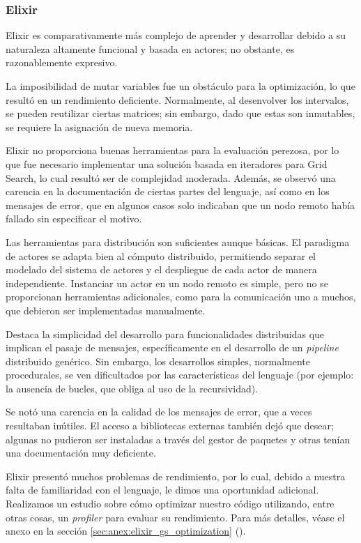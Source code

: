 \documentclass[11pt]{article}
\let\Oldsubsubsection\subsubsection
\renewcommand{\subsubsection}{\FloatBarrier\Oldsubsubsection}
\begin{document}
\subsubsection{Elixir}

Elixir es comparativamente más complejo de aprender y desarrollar debido a su naturaleza altamente funcional y basada en actores; no obstante, es razonablemente expresivo.

La imposibilidad de mutar variables fue un obstáculo para la optimización, lo que resultó en un rendimiento deficiente. Normalmente, al desenvolver los intervalos, se pueden reutilizar ciertas matrices; sin embargo, dado que estas son inmutables, se requiere la asignación de nueva memoria.

Elixir no proporciona buenas herramientas para la evaluación perezosa, por lo que fue necesario implementar una solución basada en iteradores para Grid Search, lo cual resultó ser de complejidad moderada. Además, se observó una carencia en la documentación de ciertas partes del lenguaje, así como en los mensajes de error, que en algunos casos solo indicaban que un nodo remoto había fallado sin especificar el motivo.

Las herramientas para distribución son suficientes aunque básicas. El paradigma de actores se adapta bien al cómputo distribuido, permitiendo separar el modelado del sistema de actores y el despliegue de cada actor de manera independiente. Instanciar un actor en un nodo remoto es simple, pero no se proporcionan herramientas adicionales, como para la comunicación uno a muchos, que debieron ser implementadas manualmente.

Destaca la simplicidad del desarrollo para funcionalidades distribuidas que implican el pasaje de mensajes, específicamente en el desarrollo de un \textit{pipeline} distribuido genérico. Sin embargo, los desarrollos simples, normalmente procedurales, se ven dificultados por las características del lenguaje (por ejemplo: la ausencia de bucles, que obliga al uso de la recursividad).

Se notó una carencia en la calidad de los mensajes de error, que a veces resultaban inútiles. El acceso a bibliotecas externas también dejó que desear; algunas no pudieron ser instaladas a través del gestor de paquetes y otras tenían una documentación muy deficiente.

Elixir presentó muchos problemas de rendimiento, por lo cual, debido a nuestra falta de familiaridad con el lenguaje, le dimos una oportunidad adicional. Realizamos un estudio sobre cómo optimizar nuestro código utilizando, entre otras cosas, un \textit{profiler} para evaluar su rendimiento. Para más detalles, véase el anexo en la sección \ref{sec:anex:elixir_gs_optimization} ().
\end{document}
